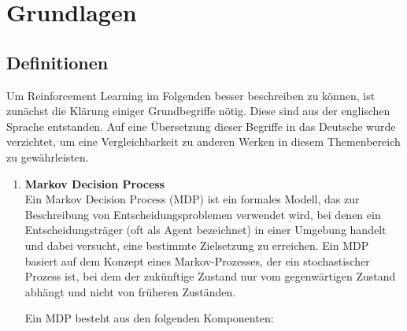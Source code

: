 \section{Grundlagen}


\subsection{Definitionen} \label{Definitionen}
Um Reinforcement Learning im Folgenden besser beschreiben zu können, ist zunächst die Klärung einiger Grundbegriffe nötig. Diese sind aus der englischen Sprache entstanden.
Auf eine Übersetzung dieser Begriffe in das Deutsche wurde verzichtet, um eine Vergleichbarkeit zu anderen Werken in diesem Themenbereich zu gewährleisten.

\begin{enumerate}
    \item \textbf{Markov Decision Process}\\
    Ein Markov Decision Process (MDP) \cite{builtinUnderstandingMarkov} ist ein formales Modell, das zur Beschreibung von Entscheidungsproblemen verwendet wird, bei denen ein Entscheidungsträger (oft als Agent bezeichnet) in einer Umgebung handelt und dabei versucht, eine bestimmte Zielsetzung zu erreichen. Ein MDP basiert auf dem Konzept eines Markov-Prozesses, der ein stochastischer Prozess ist, bei dem der zukünftige Zustand nur vom gegenwärtigen Zustand abhängt und nicht von früheren Zuständen.

    Ein MDP besteht aus den folgenden Komponenten:


\end{enumerate}
